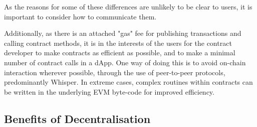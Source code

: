 As the reasons for some of these differences are unlikely to be clear to users, it is important to consider how to communicate them.

Additionally, as there is an attached "gas" fee for publishing transactions and calling contract methods, it is in the interests of the users for the contract developer to make contracts as efficient as possible, and to make a minimal number of contract calls in a dApp. One way of doing this is to avoid on-chain interaction wherever possible, through the use of peer-to-peer protocols, predominantly Whisper. In extreme cases, complex routines within contracts can be written in the underlying EVM byte-code for improved efficiency.

\subsection{Benefits of Decentralisation}
